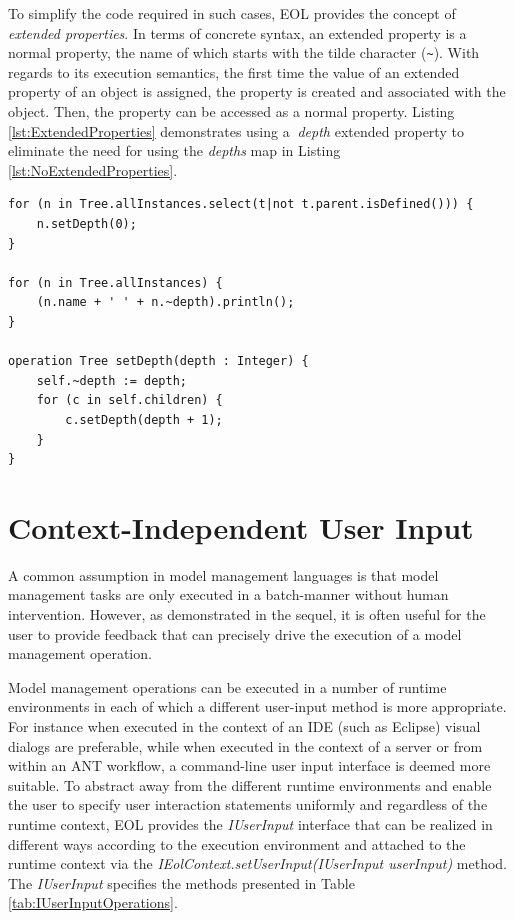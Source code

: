 To simplify the code required in such cases, EOL provides the concept of \emph{extended properties}. In terms of concrete syntax, an extended property is a normal property, the name of which starts with the tilde character (\verb|~|). With regards to its execution semantics, the first time the value of an extended property of an object is assigned, the property is created and associated with the object. Then, the property can be accessed as a normal property. Listing \ref{lst:ExtendedProperties} demonstrates using a $~$\emph{depth} extended property to eliminate the need for using the \emph{depths} map in Listing \ref{lst:NoExtendedProperties}.

\begin{lstlisting}[basicstyle=\ttfamily\footnotesize, flexiblecolumns=true, numbers=none, nolol=true, caption=A simplified version of Listing \ref{lst:NoExtendedProperties} using extended properties, label=lst:ExtendedProperties, numbers=left, language=EOL, tabsize=2]
for (n in Tree.allInstances.select(t|not t.parent.isDefined())) {
	n.setDepth(0);
}

for (n in Tree.allInstances) {
	(n.name + ' ' + n.~depth).println();
}

operation Tree setDepth(depth : Integer) {
	self.~depth := depth;
	for (c in self.children) {
		c.setDepth(depth + 1);
	}
}
\end{lstlisting}


\section{Context-Independent User Input}
\label{sec:Design.EOL.UserInput}

A common assumption in model management languages is that model management tasks are only executed in a batch-manner without human intervention. However, as demonstrated in the sequel, it is often useful for the user to provide feedback that can precisely drive the execution of a model management operation.

Model management operations can be executed in a number of runtime environments in each of which a different user-input method is more appropriate. For instance when executed in the context of an IDE (such as Eclipse) visual dialogs are preferable, while when executed in the context of a server or from within an ANT workflow, a command-line user input interface is deemed more suitable. To abstract away from the different runtime environments and enable the user to specify user interaction statements uniformly and regardless of the runtime context, EOL provides the \emph{IUserInput} interface that can be realized in different ways according to the execution environment and attached to the runtime context via the \emph{IEolContext.setUserInput(IUserInput userInput)} method. The \emph{IUserInput} specifies the methods presented in Table \ref{tab:IUserInputOperations}.

